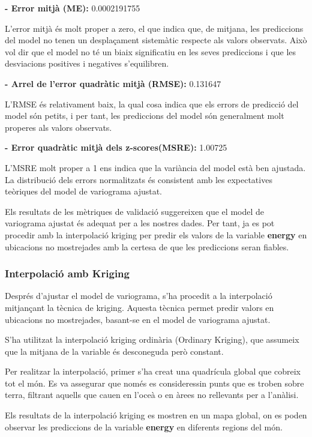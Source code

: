 \textbf{- Error mitjà (ME):} 0.0002191755

L'error mitjà és molt proper a zero, el que indica que, de mitjana, les prediccions del model no tenen un desplaçament sistemàtic respecte als valors observats. Això vol dir que el model no té un biaix significatiu en les seves prediccions i que les desviacions positives i negatives s'equilibren.

\textbf{- Arrel de l'error quadràtic mitjà (RMSE):} 0.131647

L'RMSE és relativament baix, la qual cosa indica que els errors de predicció del model són petits, i per tant, les prediccions del model són generalment molt properes als valors observats.

\textbf{- Error quadràtic mitjà dels z-scores(MSRE):} 1.00725

L'MSRE molt proper a 1 ens indica que la variància del model està ben ajustada. La distribució dels errors normalitzats és consistent amb les expectatives teòriques del model de variograma ajustat.

Els resultats de les mètriques de validació suggereixen que el model de variograma ajustat és adequat per a les nostres dades. Per tant, ja es pot procedir amb la interpolació kriging per predir els valors de la variable \textbf{energy} en ubicacions no mostrejades amb la certesa de que les prediccions seran fiables.

\subsubsection{Interpolació amb Kriging}
Després d'ajustar el model de variograma, s'ha procedit a la interpolació mitjançant la tècnica de kriging. Aquesta tècnica permet predir valors en ubicacions no mostrejades, basant-se en el model de variograma ajustat.

S'ha utilitzat la interpolació kriging ordinària (Ordinary Kriging), que assumeix que la mitjana de la variable és desconeguda però constant. 

Per realitzar la interpolació, primer s'ha creat una quadrícula global que cobreix tot el món. Es va assegurar que només es consideressin punts que es troben sobre terra, filtrant aquells que cauen en l'oceà o en àrees no rellevants per a l'anàlisi.

Els resultats de la interpolació kriging es mostren en un mapa global, on es poden observar les prediccions de la variable \textbf{energy} en diferents regions del món.

